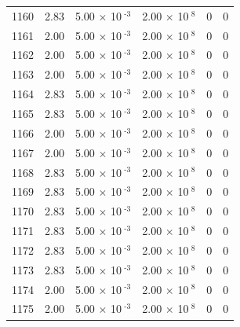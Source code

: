 \documentclass[a4paper,11pt]{article}
\begin{document}
\begin{center}
\begin{longtable}{|R{1.5cm}|R{2.4cm}|R{2.4cm}|R{2.4cm}|R{2.4cm}|R{2.4cm}|}
 1160 &   2.83  &         5.00 $\times$ 10$^{\text{          -3}}$  &         2.00 $\times$ 10$^{\text{           8}}$  & 0  & 0 \\
 1161 &   2.00  &         5.00 $\times$ 10$^{\text{          -3}}$  &         2.00 $\times$ 10$^{\text{           8}}$  & 0  & 0 \\
 1162 &   2.00  &         5.00 $\times$ 10$^{\text{          -3}}$  &         2.00 $\times$ 10$^{\text{           8}}$  & 0  & 0 \\
 1163 &   2.00  &         5.00 $\times$ 10$^{\text{          -3}}$  &         2.00 $\times$ 10$^{\text{           8}}$  & 0  & 0 \\
 1164 &   2.83  &         5.00 $\times$ 10$^{\text{          -3}}$  &         2.00 $\times$ 10$^{\text{           8}}$  & 0  & 0 \\
 1165 &   2.83  &         5.00 $\times$ 10$^{\text{          -3}}$  &         2.00 $\times$ 10$^{\text{           8}}$  & 0  & 0 \\
 1166 &   2.00  &         5.00 $\times$ 10$^{\text{          -3}}$  &         2.00 $\times$ 10$^{\text{           8}}$  & 0  & 0 \\
 1167 &   2.00  &         5.00 $\times$ 10$^{\text{          -3}}$  &         2.00 $\times$ 10$^{\text{           8}}$  & 0  & 0 \\
 1168 &   2.83  &         5.00 $\times$ 10$^{\text{          -3}}$  &         2.00 $\times$ 10$^{\text{           8}}$  & 0  & 0 \\
 1169 &   2.83  &         5.00 $\times$ 10$^{\text{          -3}}$  &         2.00 $\times$ 10$^{\text{           8}}$  & 0  & 0 \\
 1170 &   2.83  &         5.00 $\times$ 10$^{\text{          -3}}$  &         2.00 $\times$ 10$^{\text{           8}}$  & 0  & 0 \\
 1171 &   2.83  &         5.00 $\times$ 10$^{\text{          -3}}$  &         2.00 $\times$ 10$^{\text{           8}}$  & 0  & 0 \\
 1172 &   2.83  &         5.00 $\times$ 10$^{\text{          -3}}$  &         2.00 $\times$ 10$^{\text{           8}}$  & 0  & 0 \\
 1173 &   2.83  &         5.00 $\times$ 10$^{\text{          -3}}$  &         2.00 $\times$ 10$^{\text{           8}}$  & 0  & 0 \\
 1174 &   2.00  &         5.00 $\times$ 10$^{\text{          -3}}$  &         2.00 $\times$ 10$^{\text{           8}}$  & 0  & 0 \\
 1175 &   2.00  &         5.00 $\times$ 10$^{\text{          -3}}$  &         2.00 $\times$ 10$^{\text{           8}}$  & 0  & 0 \\

\end{longtable}
\end{center}
\end{document}
